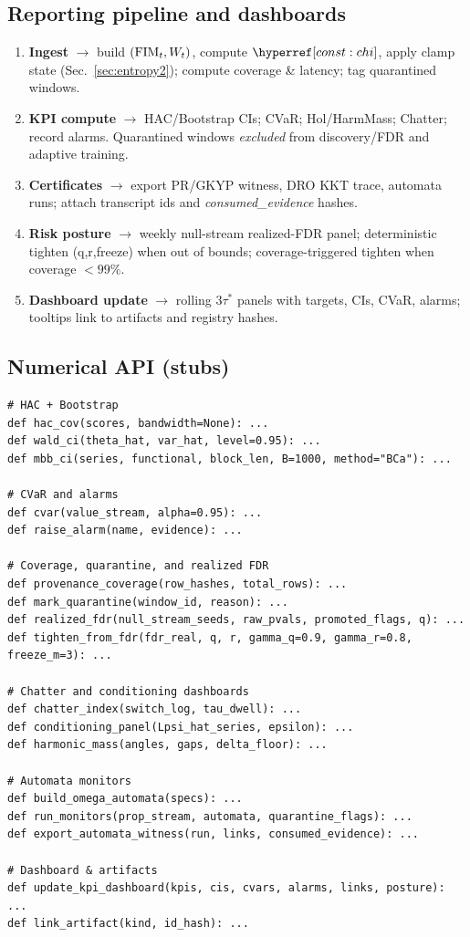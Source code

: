 \subsection*{Reporting pipeline and dashboards}
\begin{enumerate}[leftmargin=*,itemsep=2pt]
\item \textbf{Ingest} $\to$ build $(\mathrm{FIM}_t,W_t)$, compute $\constref{chi}$, apply clamp state (Sec.~\ref{sec:entropy2}); compute coverage \& latency; tag quarantined windows.
\item \textbf{KPI compute} $\to$ HAC/Bootstrap CIs; CVaR; Hol/HarmMass; Chatter; record alarms. Quarantined windows \emph{excluded} from discovery/FDR and adaptive training.
\item \textbf{Certificates} $\to$ export PR/GKYP witness, DRO KKT trace, automata runs; attach transcript ids and \emph{consumed\_evidence} hashes.
\item \textbf{Risk posture} $\to$ weekly null-stream realized-FDR panel; deterministic tighten (q,r,freeze) when out of bounds; coverage-triggered tighten when coverage $<99\%$.
\item \textbf{Dashboard update} $\to$ rolling $3\tau^\ast$ panels with targets, CIs, CVaR, alarms; tooltips link to artifacts and registry hashes.
\end{enumerate}

\subsection*{Numerical API (stubs)}
\begin{lstlisting}
# HAC + Bootstrap
def hac_cov(scores, bandwidth=None): ...
def wald_ci(theta_hat, var_hat, level=0.95): ...
def mbb_ci(series, functional, block_len, B=1000, method="BCa"): ...

# CVaR and alarms
def cvar(value_stream, alpha=0.95): ...
def raise_alarm(name, evidence): ...

# Coverage, quarantine, and realized FDR
def provenance_coverage(row_hashes, total_rows): ...
def mark_quarantine(window_id, reason): ...
def realized_fdr(null_stream_seeds, raw_pvals, promoted_flags, q): ...
def tighten_from_fdr(fdr_real, q, r, gamma_q=0.9, gamma_r=0.8, freeze_m=3): ...

# Chatter and conditioning dashboards
def chatter_index(switch_log, tau_dwell): ...
def conditioning_panel(Lpsi_hat_series, epsilon): ...
def harmonic_mass(angles, gaps, delta_floor): ...

# Automata monitors
def build_omega_automata(specs): ...
def run_monitors(prop_stream, automata, quarantine_flags): ...
def export_automata_witness(run, links, consumed_evidence): ...

# Dashboard & artifacts
def update_kpi_dashboard(kpis, cis, cvars, alarms, links, posture): ...
def link_artifact(kind, id_hash): ...
\end{lstlisting}

